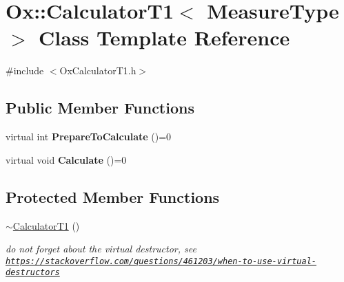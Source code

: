 \hypertarget{class_ox_1_1_calculator_t1}{}\section{Ox\+:\+:Calculator\+T1$<$ Measure\+Type $>$ Class Template Reference}
\label{class_ox_1_1_calculator_t1}


{\ttfamily \#include $<$Ox\+Calculator\+T1.\+h$>$}

\subsection*{Public Member Functions}
\begin{DoxyCompactItemize}
\item 
\mbox{\label{class_ox_1_1_calculator_t1_ac4087a7651693a5dc4f10bddf195abb8}} 
virtual int {\bfseries Prepare\+To\+Calculate} ()=0
\item 
\mbox{\label{class_ox_1_1_calculator_t1_a757a66f774c598248614a37f3d543fc8}} 
virtual void {\bfseries Calculate} ()=0
\end{DoxyCompactItemize}
\subsection*{Protected Member Functions}
\begin{DoxyCompactItemize}
\item 
\mbox{\label{class_ox_1_1_calculator_t1_aeb4d76387d3c2abcd6dd9da169f5f391}} 
\mbox{\hyperlink{class_ox_1_1_calculator_t1_aeb4d76387d3c2abcd6dd9da169f5f391}{$\sim$\+Calculator\+T1}} ()
\begin{DoxyCompactList}\small\item\em do not forget about the virtual destructor, see \href{https://stackoverflow.com/questions/461203/when-to-use-virtual-destructors}{\tt https\+://stackoverflow.\+com/questions/461203/when-\/to-\/use-\/virtual-\/destructors} \end{DoxyCompactList}\end{DoxyCompactItemize}
